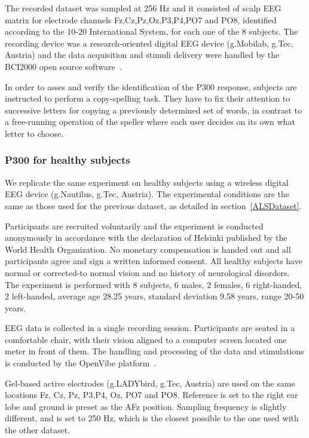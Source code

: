 \documentclass[entropy,article,submit,moreauthors,pdftex,10pt,a4paper]{mdpi}
\begin{document}
The recorded dataset was sampled at 256 Hz and it consisted of scalp EEG matrix for electrode channels Fz,Cz,Pz,Oz,P3,P4,PO7 and PO8, identified according to the 10-20 International System,  for each one of the 8 subjects.   The recording device was a research-oriented digital EEG device (g.Mobilab, g.Tec, Austria) and the data acquisition and stimuli delivery were handled by the BCI2000 open source software~\citep{Schalk2004}.

In order to asses and verify the identification of the P300 response, subjects are instructed to perform a copy-spelling task. They have to fix their attention to successive letters for copying a previously determined set of words, in contrast to a free-running operation of the speller where each user decides on its own what letter to choose.

\subsubsection{P300 for healthy subjects}

We replicate the same experiment on healthy subjects using a wireless digital EEG device (g.Nautilus, g.Tec, Austria).  The experimental conditions are the same as those used for the previous dataset, as detailed in section~\ref{ALSDataset}.

Participants are recruited voluntarily and the experiment is conducted anonymously in accordance with the declaration of Helsinki published by the World Health Organization.  No monetary compensation is handed out and all participants agree and sign a written informed consent.  All healthy subjects have normal or corrected-to normal vision and no history of neurological disorders. The experiment is performed with 8 subjects, 6 males, 2 females, 6 right-handed, 2 left-handed, average age 28.25 years, standard deviation  9.58 years, range 20-50 years.

EEG data is collected in a single recording session. Participants are seated in a comfortable chair, with their vision aligned to a computer screen located one meter in front of them.  The handling and processing of the data and stimulations is conducted by the OpenVibe platform~\citep{Renard2010}. 

Gel-based active electrodes (g.LADYbird, g.Tec, Austria) are used on the same locations Fz, Cz, Pz, P3,P4, Oz, PO7 and PO8.  Reference is set to the right ear lobe and ground is preset as the AFz position.   Sampling frequency is slightly different, and is set to 250 Hz, which is the closest possible to the one used with the other dataset.
\end{document}
